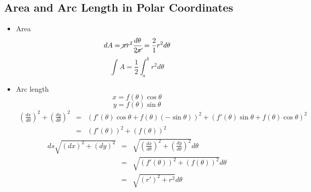 \subsection*{Area and Arc Length in Polar Coordinates}
\begin{itemize}
\item Area
\[dA = \displaystyle \cancel{\pi} r^2 \frac{d\theta}{2\cancel{\pi}} = \frac{2}{1} r^2 d\theta\]
\[\displaystyle \int A = \frac{1}{2} \int^b_a r^2 d\theta\]
\item Arc length
\[x = f(\theta)\cos \theta\]
\[y = f(\theta) \sin \theta\]
\[\begin{array}{rcl}
\displaystyle (\frac{dx}{d\theta})^2 + (\frac{dy}{d \theta})^2 & = & (f'(\theta) \cos \theta + f(\theta) (-\sin \theta))^2 + (f'(\theta) \sin \theta + f(\theta) \cos \theta)^2\\
& = & (f'(\theta))^2 + (f(\theta))^2
\end{array}\]
\[\begin{array}{rcl}
ds \sqrt{(dx)^2 + (dy)^2} & = & \displaystyle \sqrt{(\frac{dx}{d\theta})^2 + (\frac{dy}{d\theta})^2} d\theta\\
& = & \sqrt{(f'(\theta))^2 + (f(\theta))^2} d\theta\\
& = & \sqrt{(r')^2 + r^2} d\theta
\end{array}\]
\end{itemize}
